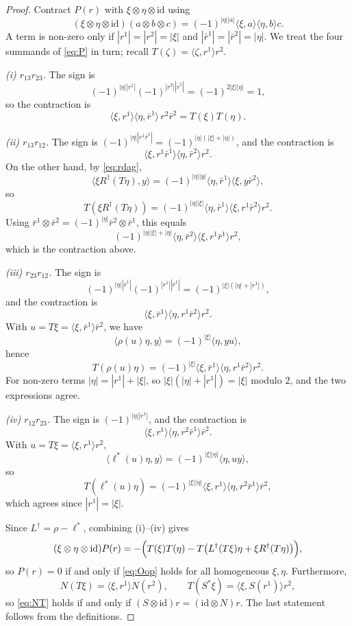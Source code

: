 \documentclass[11pt]{article}
\theoremstyle{definition}
\newcommand{\id}{\mathrm{id}}
\newcommand{\lr}[1]{\langle #1\rangle}
\begin{document}
\begin{proof}
Contract $P(r)$ with $\xi\otimes\eta\otimes\id$ using
\[
(\xi\otimes\eta\otimes\id)(a\otimes b\otimes c)
=(-1)^{|\eta||a|}\lr{\xi,a}\lr{\eta,b}c.
\]
A term is non-zero only if $|r^1|=|r^2|=|\xi|$ and $|\bar r^1|=|\bar r^2|=|\eta|$. We treat the four summands of \eqref{eq:P} in turn; recall $T(\zeta)=\lr{\zeta,r^1}r^2$.

\emph{(i) $r_{13}r_{23}$.}
The sign is
\[
(-1)^{|\eta||r^1|}(-1)^{|r^2||\bar r^1|}
=(-1)^{2|\xi||\eta|}=1,
\]
so the contraction is
\[
\lr{\xi,r^1}\lr{\eta,\bar r^1}\,r^2\bar r^2=T(\xi)T(\eta).
\]

\emph{(ii) $r_{13}r_{12}$.}
The sign is $(-1)^{|\eta||r^1\bar r^1|}=(-1)^{|\eta|(|\xi|+|\eta|)}$, and the contraction is
\[
\lr{\xi,r^1\bar r^1}\lr{\eta,\bar r^2}r^2.
\]
On the other hand, by \eqref{eq:rdag},
\[
\lr{\xi R^\dagger(T\eta),y}
=(-1)^{|\eta||y|}\lr{\eta,\bar r^1}\lr{\xi,y\bar r^2},
\]
so
\[
T(\xi R^\dagger(T\eta))
=(-1)^{|\eta||\xi|}\lr{\eta,\bar r^1}\lr{\xi,r^1\bar r^2}r^2.
\]
Using $\bar r^1\otimes\bar r^2=(-1)^{|\eta|}\bar r^2\otimes\bar r^1$, this equals
\[
(-1)^{|\eta||\xi|+|\eta|}\lr{\eta,\bar r^2}\lr{\xi,r^1\bar r^1}r^2,
\]
which is the contraction above.

\emph{(iii) $r_{23}r_{12}$.}
The sign is
\[
(-1)^{|\eta||\bar r^1|}(-1)^{|r^1||\bar r^1|}
=(-1)^{|\xi|(|\eta|+|r^1|)},
\]
and the contraction is
\[
\lr{\xi,\bar r^1}\lr{\eta,r^1\bar r^2}r^2.
\]
With $u=T\xi=\lr{\xi,\bar r^1}\bar r^2$, we have
\[
\lr{\rho(u)\eta,y}=(-1)^{|\xi|}\lr{\eta,yu},
\]
hence
\[
T(\rho(u)\eta)=(-1)^{|\xi|}\lr{\xi,\bar r^1}\lr{\eta,r^1\bar r^2}r^2.
\]
For non-zero terms $|\eta|=|r^1|+|\xi|$, so $|\xi|(|\eta|+|r^1|)=|\xi|$ modulo $2$, and the two expressions agree.

\emph{(iv) $r_{12}r_{23}$.}
The sign is $(-1)^{|\eta||r^1|}$, and the contraction is
\[
\lr{\xi,r^1}\lr{\eta,r^2\bar r^1}\bar r^2.
\]
With $u=T\xi=\lr{\xi,r^1}r^2$,
\[
\lr{\ell^*(u)\eta,y}=(-1)^{|\xi||\eta|}\lr{\eta,uy},
\]
so
\[
T(\ell^*(u)\eta)
=(-1)^{|\xi||\eta|}\lr{\xi,r^1}\lr{\eta,r^2\bar r^1}\bar r^2,
\]
which agrees since $|r^1|=|\xi|$.

Since $L^\dagger=\rho-\ell^*$, combining (i)--(iv) gives
\[
(\xi\otimes\eta\otimes\id)P(r)
=-\Bigl(T(\xi)T(\eta)-T\bigl(L^\dagger(T\xi)\eta+\xi R^\dagger(T\eta)\bigr)\Bigr),
\]
so $P(r)=0$ if and only if \eqref{eq:Oop} holds for all homogeneous $\xi,\eta$. Furthermore,
\[
N(T\xi)=\lr{\xi,r^1}N(r^2),
\qquad
T(S^*\xi)=\lr{\xi,S(r^1)}r^2,
\]
so \eqref{eq:NT} holds if and only if $(S\otimes\id)r=(\id\otimes N)r$. The last statement follows from the definitions.
\end{proof}
\end{document}
